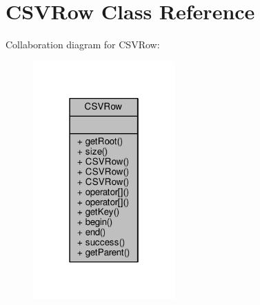 \hypertarget{classCSVRow}{}\section{C\+S\+V\+Row Class Reference}
\label{classCSVRow}


Collaboration diagram for C\+S\+V\+Row\+:
\nopagebreak
\begin{figure}[H]
\begin{center}
\leavevmode
\includegraphics[width=154pt]{d9/d56/classCSVRow__coll__graph}
\end{center}
\end{figure}
